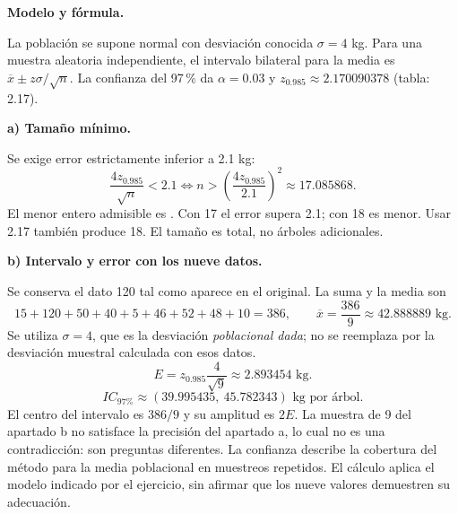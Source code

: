 \textbf{Modelo y fórmula.}\par\nopagebreak[4]
La población se supone normal con desviación conocida $\sigma=4$ kg. Para una muestra aleatoria independiente, el intervalo bilateral para la media es $\overline x\pm z\sigma/\sqrt n$. La confianza del 97\,\% da $\alpha=0.03$ y $z_{0.985}\approx2.170090378$ (tabla: 2.17).

\textbf{a) Tamaño mínimo.}\par\nopagebreak[4]
Se exige error estrictamente inferior a 2.1 kg:
\[
\frac{4z_{0.985}}{\sqrt n}<2.1
\iff n>\left(\frac{4z_{0.985}}{2.1}\right)^2
\approx17.085868.
\]
El menor entero admisible es . Con 17 el error supera 2.1; con 18 es menor. Usar 2.17 también produce 18. El tamaño es total, no árboles adicionales.

\textbf{b) Intervalo y error con los nueve datos.}\par\nopagebreak[4]
Se conserva el dato 120 tal como aparece en el original. La suma y la media son
\[
15+120+50+40+5+46+52+48+10=386,\qquad
\overline x=\frac{386}{9}\approx42.888889\text{ kg}.
\]
Se utiliza $\sigma=4$, que es la desviación \emph{poblacional dada}; no se reemplaza por la desviación muestral calculada con esos datos.
\[
\boxed{E=z_{0.985}\frac4{\sqrt9}\approx2.893454\text{ kg}.}
\]
\[
\boxed{IC_{\text{97\%}}\approx(39.995435,\ 45.782343)\text{ kg por árbol}.}
\]
El centro del intervalo es $386/9$ y su amplitud es $2E$. La muestra de 9 del apartado b no satisface la precisión del apartado a, lo cual no es una contradicción: son preguntas diferentes. La confianza describe la cobertura del método para la media poblacional en muestreos repetidos. El cálculo aplica el modelo indicado por el ejercicio, sin afirmar que los nueve valores demuestren su adecuación.
